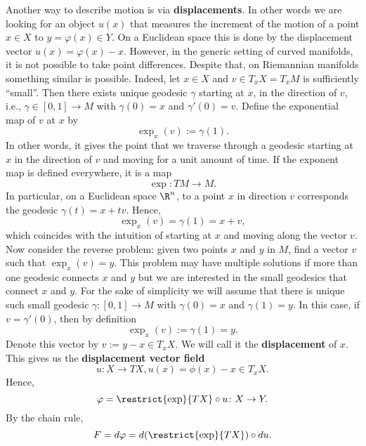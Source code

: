 \begin{discussion}
  Another way to describe motion is via \textbf{displacements}.
  In other words we are looking for an object $u(x)$ that measures the increment
  of the motion of a point $x \in X$ to $y = \varphi(x) \in Y$.
  On a Euclidean space this is done by the displacement vector
  $u(x) = \varphi(x) - x$.
  However, in the generic setting of curved manifolds, it is not possible to
  take point differences.
  Despite that, on Riemannian manifolds something similar is possible.
  Indeed, let $x \in X$ and $v \in T_x X = T_x M$ is sufficiently ``small''.
  Then there exists unique geodesic $\gamma$ starting at $x$, in the direction
  of $v$, i.e., $\gamma \in [0, 1] \to M$ with $\gamma(0) = x$ and
  $\gamma'(0) = v$.
  Define the exponential map of $v$ at $x$ by
  \begin{equation}
    \exp_x(v) := \gamma(1).
  \end{equation}
  In other words, it gives the point that we traverse through a geodesic
  starting at $x$ in the direction of $v$ and moving for a unit amount of time.
  If the exponent map is defined everywhere, it is a map
  \begin{equation}
    \exp \colon T M \to M.
  \end{equation}
  In particular, on a Euclidean space $\R^n$, to a point $x$ in direction $v$
  corresponds the geodesic $\gamma(t) = x + t v$.
  Hence,
  \begin{equation}
    \exp_x(v) = \gamma(1) = x + v,
  \end{equation}
  which coincides with the intuition of starting at $x$ and moving along the
  vector $v$.
  Now consider the reverse problem: given two points $x$ and $y$ in $M$,
  find a vector $v$ such that $\exp_x(v) = y$.
  This problem may have multiple solutions if more than one geodesic connects
  $x$ and $y$ but we are interested in the small geodesics that connect $x$ and
  $y$.
  For the sake of simplicity we will assume that there is unique such small
  geodesic $\gamma \colon [0, 1] \to M$ with $\gamma(0) = x$ and
  $\gamma(1) = y$.
  In this case, if $v = \gamma'(0)$, then by definition
  \begin{equation}
    \exp_x(v) := \gamma(1) = y.
  \end{equation}
  Denote this vector by $v := y - x \in T_x X$.
  We will call it the \textbf{displacement} of $x$.
  This gives us the \textbf{displacement vector field}
  \begin{equation}
    u \colon X \to T X, u(x) = \phi(x) - x \in T_x X.
  \end{equation}
  Hence,
  \begin{equation}
    \varphi = \restrict{\exp}{T X} \circ u \colon X \to Y.
  \end{equation}
  By the chain rule,
  \begin{equation}
    F = d \varphi = d(\restrict{\exp}{T X}) \circ d u.
  \end{equation}
\end{discussion}
